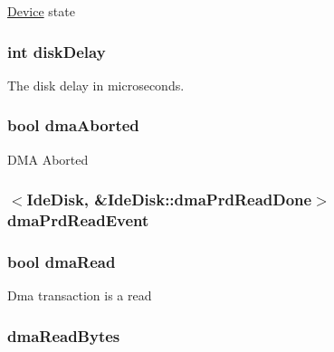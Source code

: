 \label{classIdeDisk_a5fb52a264b2cccb6ccad92493dff5deb}
\hyperlink{namespaceDevice}{Device} state \hypertarget{classIdeDisk_af49c4a1e28104d83429a5ae73e388143}{
\subsubsection[{diskDelay}]{\setlength{\rightskip}{0pt plus 5cm}int {\bf diskDelay}}}
\label{classIdeDisk_af49c4a1e28104d83429a5ae73e388143}
The disk delay in microseconds. \hypertarget{classIdeDisk_aedff89f76b12103a29d22ef4de302236}{
\subsubsection[{dmaAborted}]{\setlength{\rightskip}{0pt plus 5cm}bool {\bf dmaAborted}}}
\label{classIdeDisk_aedff89f76b12103a29d22ef4de302236}
DMA Aborted \hypertarget{classIdeDisk_aee6a35e547d828db5c3f993da6179be0}{
\subsubsection[{dmaPrdReadEvent}]{$<${\bf IdeDisk}, \&IdeDisk::dmaPrdReadDone$>$ {\bf dmaPrdReadEvent}}}
\label{classIdeDisk_aee6a35e547d828db5c3f993da6179be0}
\hypertarget{classIdeDisk_a3f1cf4317e46c3c845d144c5e0334096}{
\subsubsection[{dmaRead}]{\setlength{\rightskip}{0pt plus 5cm}bool {\bf dmaRead}}}
\label{classIdeDisk_a3f1cf4317e46c3c845d144c5e0334096}
Dma transaction is a read \hypertarget{classIdeDisk_a01f4e9b11f3b49ac1cb6cbb6d51674c2}{
\subsubsection[{dmaReadBytes}]{ {\bf dmaReadBytes}}}
